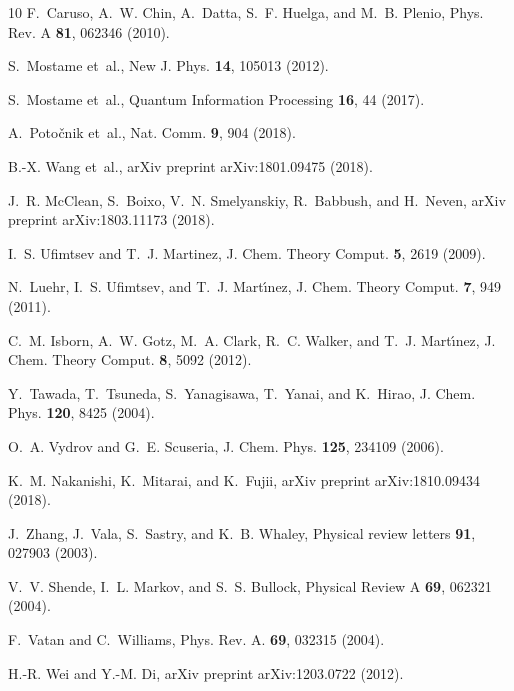 \documentclass[aps,prl,twocolumn,showpacs,superscriptaddress,groupedaddress]{revtex4}  %
\begin{document}
\begin{thebibliography}{10}
F.~Caruso, A.~W. Chin, A.~Datta, S.~F. Huelga, and M.~B. Plenio,
\newblock Phys. Rev. A {\bf 81}, 062346 (2010).

S.~Mostame et~al.,
\newblock New J. Phys. {\bf 14}, 105013 (2012).

S.~Mostame et~al.,
\newblock Quantum Information Processing {\bf 16}, 44 (2017).

A.~Poto{\v{c}}nik et~al.,
\newblock Nat. Comm. {\bf 9}, 904 (2018).

B.-X. Wang et~al.,
\newblock arXiv preprint arXiv:1801.09475  (2018).

J.~R. McClean, S.~Boixo, V.~N. Smelyanskiy, R.~Babbush, and H.~Neven,
\newblock arXiv preprint arXiv:1803.11173  (2018).

I.~S. Ufimtsev and T.~J. Martinez,
\newblock J. Chem. Theory Comput. {\bf 5}, 2619 (2009).

N.~Luehr, I.~S. Ufimtsev, and T.~J. Mart{\'\i}nez,
\newblock J. Chem. Theory Comput. {\bf 7}, 949 (2011).

C.~M. Isborn, A.~W. Gotz, M.~A. Clark, R.~C. Walker, and T.~J. Mart{\'\i}nez,
\newblock J. Chem. Theory Comput. {\bf 8}, 5092 (2012).

Y.~Tawada, T.~Tsuneda, S.~Yanagisawa, T.~Yanai, and K.~Hirao,
\newblock J. Chem. Phys. {\bf 120}, 8425 (2004).

O.~A. Vydrov and G.~E. Scuseria,
\newblock J. Chem. Phys. {\bf 125}, 234109 (2006).

K.~M. Nakanishi, K.~Mitarai, and K.~Fujii,
\newblock arXiv preprint arXiv:1810.09434  (2018).

J.~Zhang, J.~Vala, S.~Sastry, and K.~B. Whaley,
\newblock Physical review letters {\bf 91}, 027903 (2003).

V.~V. Shende, I.~L. Markov, and S.~S. Bullock,
\newblock Physical Review A {\bf 69}, 062321 (2004).

F.~Vatan and C.~Williams,
\newblock Phys. Rev. A. {\bf 69}, 032315 (2004).

H.-R. Wei and Y.-M. Di,
\newblock arXiv preprint arXiv:1203.0722  (2012).

\end{thebibliography}



\end{document}
